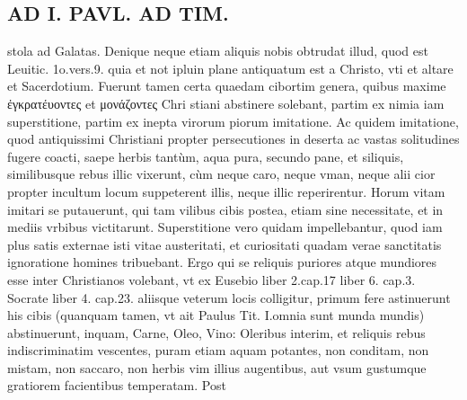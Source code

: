 \documentclass{article}
\begin{document}
\begin{pages}
\section*{AD I. PAVL. AD TIM. }
\marginpar{[ p.370 ]}\pstart stola ad Galatas. Denique neque etiam aliquis nobis obtrudat illud, quod est Leuitic. 1o.vers.9. quia et not ipluin plane antiquatum est a Christo, vti et altare et Sacerdotium.  \pend\pstart Fuerunt tamen certa quaedam cibortim genera, quibus maxime ἐγκρατέυοντες et μονάζοντες Chri stiani abstinere solebant, partim ex nimia iam superstitione, partim ex inepta virorum piorum imitatione. Ac quidem imitatione, quod antiquissimi Christiani propter persecutiones in deserta ac vastas solitudines fugere coacti, saepe herbis tantùm, aqua pura, secundo pane, et siliquis, similibusque rebus illic vixerunt, cùm neque caro, neque vman, neque alii cior propter incultum locum suppeterent illis, neque illic reperirentur. Horum vitam imitari se putauerunt, qui tam vilibus cibis postea, etiam sine necessitate, et in mediis vrbibus victitarunt.  \pend\pstart Superstitione vero quidam impellebantur, quod iam plus satis externae isti vitae austeritati, et curiositati quadam verae sanctitatis ignoratione homines tribuebant. Ergo qui se reliquis puriores atque mundiores esse inter Christianos volebant, vt ex Eusebio liber 2.cap.17 liber  6. cap.3. Socrate liber  4. cap.23. aliisque veterum locis colligitur, primum fere astinuerunt his cibis (quanquam tamen, vt ait Paulus Tit. I.omnia sunt munda mundis) abstinuerunt, inquam, Carne, Oleo, Vino: Oleribus interim, et reliquis rebus indiscriminatim vescentes, puram etiam aquam potantes, non conditam, non mistam, non saccaro, non herbis vim illius augentibus, aut vsum gustumque  gratiorem facientibus temperatam. Post\pend

\end{pages}
\end{document}
